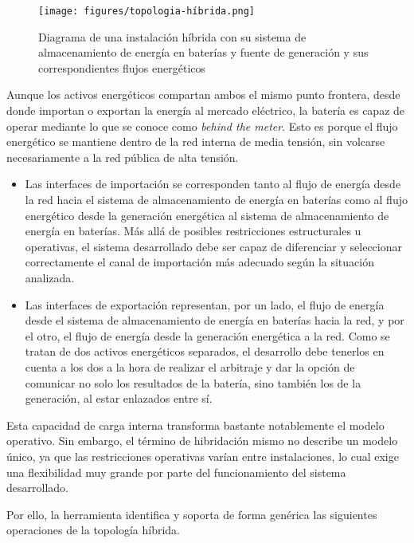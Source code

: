 \begin{figure}
\centering
\texttt{[image: figures/topologia-híbrida.png]}
\caption{Diagrama de una instalación híbrida con su sistema de almacenamiento de energía en baterías y fuente de generación y sus correspondientes flujos energéticos}
\label{fig:topologia-híbrida}
\end{figure}

Aunque los activos energéticos compartan ambos el mismo punto frontera, desde donde importan o exportan la energía al mercado eléctrico, la batería es capaz de operar mediante lo que se conoce como \textit{behind the meter}. Esto es porque el flujo energético se mantiene dentro de la red interna de media tensión, sin volcarse necesariamente a la red pública de alta tensión.

\begin{itemize}

\item Las interfaces de importación se corresponden tanto al flujo de energía desde la red hacia el sistema de almacenamiento de energía en baterías como al flujo energético desde la generación energética al sistema de almacenamiento de energía en baterías. Más allá de posibles restricciones estructurales u operativas, el sistema desarrollado debe ser capaz de diferenciar y seleccionar correctamente el canal de importación más adecuado según la situación analizada.
          
\item Las interfaces de exportación representan, por un lado, el flujo de energía desde el sistema de almacenamiento de energía en baterías hacia la red, y por el otro, el flujo de energía desde la generación energética a la red. Como se tratan de dos activos energéticos separados, el desarrollo debe tenerlos en cuenta a los dos a la hora de realizar el arbitraje y dar la opción de comunicar no solo los resultados de la batería, sino también los de la generación, al estar enlazados entre sí.

\end{itemize}

Esta capacidad de carga interna transforma bastante notablemente el modelo operativo. Sin embargo, el término de hibridación mismo no describe un modelo único, ya que las restricciones operativas varían entre instalaciones, lo cual exige una flexibilidad muy grande por parte del funcionamiento del sistema desarrollado.

Por ello, la herramienta identifica y soporta de forma genérica las siguientes operaciones de la topología híbrida.


